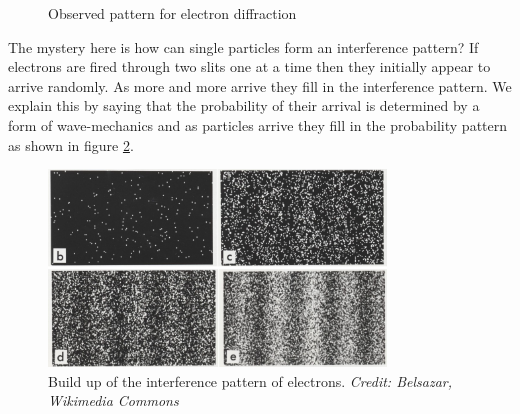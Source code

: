 \documentclass[revision-guide.tex]{subfiles}
\begin{document}
\begin{figure}[!h]
  \begin{center}
  \end{center}
  \caption{Observed pattern for electron diffraction}
  \label{fig:electron-diff-observed}
\end{figure}

The mystery here is how can single particles form an interference pattern? If electrons are fired through two slits one at a time then they initially appear to arrive randomly. As more and more arrive they fill in the interference pattern. We explain this by saying that the probability of their arrival is determined by a form of wave-mechanics and as particles arrive they fill in the probability pattern as shown in figure \ref{fig:electron-buildup}.

\begin{figure}
  \begin{center}
  \includegraphics[width=0.8\textwidth]{figs/chapt-9/electron-diff.jpg}
\end{center}
  \caption{Build up of the interference pattern of electrons. \emph{Credit: Belsazar, Wikimedia Commons}}
  \label{fig:electron-buildup}
\end{figure}

\clearpage

\end{document}
